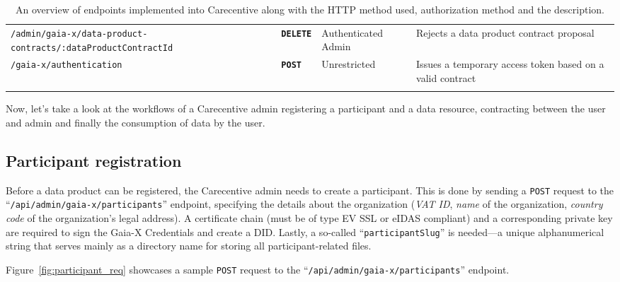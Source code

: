 \begin{longtable}{ |p{4cm}|p{2cm}|p{2cm}|p{7cm}| }
    \hhline{----}
    \texttt{/admin/gaia-x/data-product-contracts/:dataProductContractId} & \textbf{\texttt{DELETE}} & Authenticated Admin & Rejects a data product contract proposal\\
    \hhline{----}
    \texttt{/gaia-x/authentication} & \textbf{\texttt{POST}} & Unrestricted & Issues a temporary access token based on a valid contract\\
    \hhline{----}
    \caption{An overview of endpoints implemented into Carecentive along with the HTTP method used, authorization method and the description.}
    \label{tab:endpoints}
\end{longtable}

Now, let's take a look at the workflows of a Carecentive admin registering a participant and a data resource, contracting between the user and admin and finally the consumption of data by the user.

\subsection{Participant registration}\label{subsec:participant-registration}

Before a data product can be registered, the Carecentive admin needs to create a participant.
This is done by sending a \texttt{POST} request to the ``\texttt{/api/admin/gaia-x/participants}'' endpoint, specifying the details about the organization (\textit{VAT ID}, \textit{name} of the organization, \textit{country code} of the organization's legal address).
A certificate chain (must be of type EV SSL or eIDAS compliant) and a corresponding private key are required to sign the Gaia-X Credentials and create a DID.
Lastly, a so-called ``\texttt{participantSlug}'' is needed—a unique alphanumerical string that serves mainly as a directory name for storing all participant-related files.

Figure~\ref{fig:participant_req} showcases a sample \texttt{POST} request to the ``\texttt{/api/admin/gaia-x/participants}'' endpoint.

